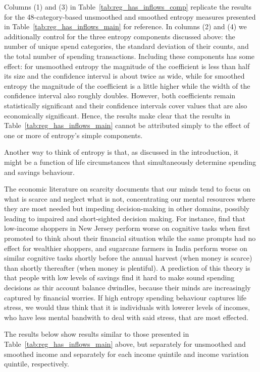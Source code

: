 Columns (1) and (3) in Table~\ref{tab:reg_has_inflows_comp} replicate the
results for the 48-category-based unsmoothed and smoothed entropy measures
presented in Table~\ref{tab:reg_has_inflows_main} for reference. In columns (2)
and (4) we additionally control for the three entropy components discussed
above: the number of unique spend categories, the standard deviation of their
counts, and the total number of spending transactions. Including these
components has some effect: for unsmoothed entropy the magnitude of the
coefficient is less than half its size and the confidence interval is about
twice as wide, while for smoothed entropy the magnitude of the coefficient is a
little higher while the width of the confidence interval also roughly doubles.
However, both coefficients remain statistically significant and their
confidence intervals cover values that are also economically significant.
Hence, the results make clear that the results in
Table~\ref{tab:reg_has_inflows_main} cannot be attributed simply to the effect
of one or more of entropy's simple components.

Another way to think of entropy is that, as discussed in the introduction, it
might be a function of life circumstances that simultaneously determine
spending and savings behaviour.


The economic literature on scarcity documents that our minds tend to focus on
what is scarce and neglect what is not, concentrating our mental resources
where they are most needed but impeding decision-making in other domains,
possibly leading to impaired and short-sighted decision
making\citep{shah2012some, mullainathan2013scarcity, haushofer2014psychology}.
For instance, \citet{mani2013poverty} find that low-income shoppers in New
Jersey perform worse on cognitive tasks when first promoted to think about
their financial situation while the same prompts had no effect for wealthier
shoppers, and sugarcane farmers in India perform worse on similar cognitive
tasks shortly before the annual harvest (when money is scarce) than shortly
thereafter (when money is plentiful). A prediction of this theory is that
people with low levels of savings find it hard to make sound spending decisions
as thir account balance dwindles, because their minds are increasingly captured
by financial worries. If high entropy spending behaviour captures life stress,
we would thus think that it is individuals with lowerer levels of incomes, who
have less mental bandwith to deal with said stress, that are most effected.

The results below show results similar to those presented in
Table~\ref{tab:reg_has_inflows_main} above, but separately for unsmoothed and
smoothed income and separately for each income quintile and income variation
quintile, respectively.

